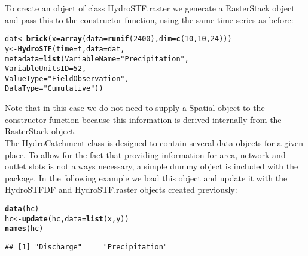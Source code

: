 \documentclass{icldt}\usepackage[]{graphicx}\usepackage[]{color}
\makeatletter
\newcommand{\hlnum}[1]{\textcolor[rgb]{0.686,0.059,0.569}{#1}}%
\newcommand{\hlstr}[1]{\textcolor[rgb]{0.192,0.494,0.8}{#1}}%
\newcommand{\hlstd}[1]{\textcolor[rgb]{0.345,0.345,0.345}{#1}}%
\newcommand{\hlkwb}[1]{\textcolor[rgb]{0.69,0.353,0.396}{#1}}%
\newcommand{\hlkwc}[1]{\textcolor[rgb]{0.333,0.667,0.333}{#1}}%
\newcommand{\hlkwd}[1]{\textcolor[rgb]{0.737,0.353,0.396}{\textbf{#1}}}%
\newenvironment{kframe}{%
 \def\at@end@of@kframe{}%
 \ifinner\ifhmode%
  \def\at@end@of@kframe{\end{minipage}}%
  \begin{minipage}{\columnwidth}%
 \fi\fi%
 \def\FrameCommand##1{\hskip\@totalleftmargin \hskip-\fboxsep
 \colorbox{shadecolor}{##1}\hskip-\fboxsep
     \hskip-\linewidth \hskip-\@totalleftmargin \hskip\columnwidth}%
 \MakeFramed {\advance\hsize-\width
   \@totalleftmargin\z@ \linewidth\hsize
   \@setminipage}}%
 {\par\unskip\endMakeFramed%
 \at@end@of@kframe}
\newenvironment{knitrout}{}{} %
\makeatother
\begin{document}
\noindent To create an object of class HydroSTF.raster we generate a RasterStack object and pass this to the constructor function, using the same time series as before:

\begin{knitrout}
\color{fgcolor}\begin{kframe}
\begin{alltt}
\hlstd{dat} \hlkwb{<-} \hlkwd{brick}\hlstd{(}\hlkwc{x}\hlstd{=}\hlkwd{array}\hlstd{(}\hlkwc{data}\hlstd{=}\hlkwd{runif}\hlstd{(}\hlnum{2400}\hlstd{),} \hlkwc{dim}\hlstd{=}\hlkwd{c}\hlstd{(}\hlnum{10}\hlstd{,}\hlnum{10}\hlstd{,}\hlnum{24}\hlstd{)))}
\hlstd{y} \hlkwb{<-} \hlkwd{HydroSTF}\hlstd{(}\hlkwc{time}\hlstd{=t,} \hlkwc{data}\hlstd{=dat,}
              \hlkwc{metadata}\hlstd{=}\hlkwd{list}\hlstd{(}\hlkwc{VariableName}\hlstd{=}\hlstr{"Precipitation"}\hlstd{,}
                            \hlkwc{VariableUnitsID}\hlstd{=}\hlnum{52}\hlstd{,}
                            \hlkwc{ValueType}\hlstd{=}\hlstr{"Field Observation"}\hlstd{,}
                            \hlkwc{DataType}\hlstd{=}\hlstr{"Cumulative"}\hlstd{))}
\end{alltt}
\end{kframe}
\end{knitrout}

\noindent Note that in this case we do not need to supply a Spatial object to the constructor function because this information is derived internally from the RasterStack object. \\

The HydroCatchment class is designed to contain several data objects for a given place. To allow for the fact that providing information for area, network and outlet slots is not always necessary, a simple dummy object is included with the package. In the following example we load this object and update it with the HydroSTFDF and HydroSTF.raster objects created previously:

\begin{knitrout}
\color{fgcolor}\begin{kframe}
\begin{alltt}
\hlkwd{data}\hlstd{(hc)}
\hlstd{hc} \hlkwb{<-} \hlkwd{update}\hlstd{(hc,} \hlkwc{data}\hlstd{=}\hlkwd{list}\hlstd{(x, y))}
\hlkwd{names}\hlstd{(hc)}
\end{alltt}
\begin{verbatim}
## [1] "Discharge"     "Precipitation"
\end{verbatim}
\end{kframe}
\end{knitrout}
\end{document}
